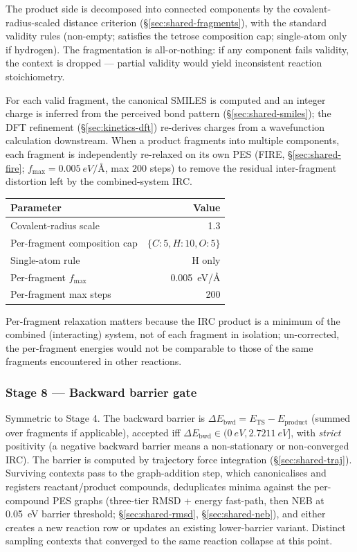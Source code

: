 The product side is decomposed into connected components by the covalent-radius-scaled distance criterion (\S\ref{sec:shared-fragments}), with the standard validity rules (non-empty; satisfies the tetrose composition cap; single-atom only if hydrogen). The fragmentation is all-or-nothing: if any component fails validity, the context is dropped --- partial validity would yield inconsistent reaction stoichiometry.

For each valid fragment, the canonical SMILES is computed and an integer charge is inferred from the perceived bond pattern (\S\ref{sec:shared-smiles}); the DFT refinement (\S\ref{sec:kinetics-dft}) re-derives charges from a wavefunction calculation downstream. When a product fragments into multiple components, each fragment is independently re-relaxed on its own PES (FIRE, \S\ref{sec:shared-fire}; $f_\text{max} = \SI{0.005}{eV/\angstrom}$, max $200$ steps) to remove the residual inter-fragment distortion left by the combined-system IRC.

\noindent\begin{tabular}{lr}
\toprule
Parameter & Value \\
\midrule
Covalent-radius scale & 1.3 \\
Per-fragment composition cap & $\{C{:}5,H{:}10,O{:}5\}$ \\
Single-atom rule & H only \\
Per-fragment $f_\text{max}$ & \SI{0.005}{eV/\angstrom} \\
Per-fragment max steps & 200 \\
\bottomrule
\end{tabular}

Per-fragment relaxation matters because the IRC product is a minimum of the combined (interacting) system, not of each fragment in isolation; un-corrected, the per-fragment energies would not be comparable to those of the same fragments encountered in other reactions.


\subsubsection{Stage 8 --- Backward barrier gate}
\label{sec:bwd-barrier}

Symmetric to Stage 4. The backward barrier is $\Delta E_\text{bwd} = E_\text{TS} - E_\text{product}$ (summed over fragments if applicable), accepted iff $\Delta E_\text{bwd} \in (\SI{0}{eV}, \SI{2.7211}{eV}]$, with \emph{strict} positivity (a negative backward barrier means a non-stationary or non-converged IRC). The barrier is computed by trajectory force integration (\S\ref{sec:shared-traj}). Surviving contexts pass to the graph-addition step, which canonicalises and registers reactant/product compounds, deduplicates minima against the per-compound PES graphs (three-tier RMSD + energy fast-path, then NEB at \SI{0.05}{eV} barrier threshold; \S\ref{sec:shared-rmsd}, \S\ref{sec:shared-neb}), and either creates a new reaction row or updates an existing lower-barrier variant. Distinct sampling contexts that converged to the same reaction collapse at this point.


